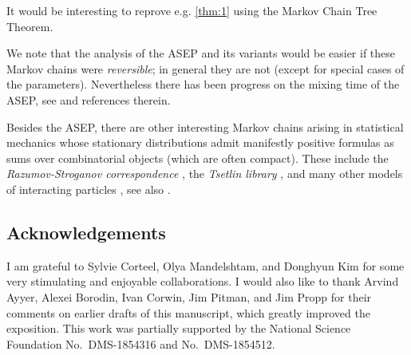 \documentclass[11pt]{amsart}
\theoremstyle{definition}
\theoremstyle{remark}
\begin{document}
	
\normalsize{

It would be interesting to reprove e.g. \cref{thm:1} 
using the Markov Chain Tree Theorem.

We note that the analysis of the ASEP and its variants would be easier
if these Markov chains were \emph{reversible}; in general 
they are not (except for special cases of the parameters).  Nevertheless
there has been progress on the mixing time of the ASEP,
see \cite{Nestoridi} and references therein.

Besides the ASEP,  
there are other interesting Markov chains
arising in statistical mechanics whose stationary distributions admit 
manifestly 
positive formulas as sums over combinatorial objects
(which are often compact).
These include 
the \emph{Razumov-Stroganov
correspondence} 
\cite{PDF, DGR, CS}, 
the \emph{Tsetlin library}
\cite{Tsetlin, Hendricks}, 
and many
other models of interacting particles \cite{AyyerMallick, AyyerNadeau}, see also
\cite{AyyerSlides}.

}

\subsection*{Acknowledgements} 
I am grateful to 
Sylvie Corteel, Olya Mandelshtam, and Donghyun Kim for some very 
stimulating and enjoyable collaborations.
I would also like to thank 
Arvind Ayyer, Alexei Borodin, Ivan Corwin, Jim Pitman, and Jim Propp for 
their comments on earlier drafts of this manuscript, which greatly 
improved the exposition.
This work was partially supported by the National Science Foundation
No.\ DMS-1854316 and No.\ DMS-1854512.








%




\end{document}
